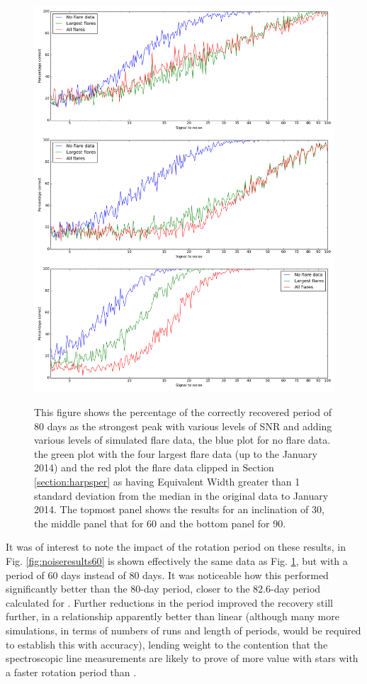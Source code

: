 \begin{figure}[!htbp]
\begin{center}
\includegraphics[scale=0.25]{Figures/Np80.png} \\
\end{center}
\caption{This figure shows the percentage of the correctly recovered period of 80 days as the strongest peak with
  various levels of SNR and adding various levels of simulated flare data, the blue plot for no flare data. the green
  plot with the four largest flare data (up to the January 2014) and the red plot the flare data clipped in Section
  \ref{section:harpsper} as having Equivalent Width greater than 1 standard deviation from the median in the original
  data to January 2014.  The topmost panel shows the results for an inclination of 30{\degree}, the middle panel that
  for 60{\degree} and the bottom panel for 90{\degree}.}
\protect\label{fig:noiseresults}
\end{figure}

It was of interest to note the impact of the rotation period on these results, in Fig. \ref{fig:noiseresults60} is shown
effectively the same data as Fig. \ref{fig:noiseresults}, but with a period of 60 days instead of 80 days. It was
noticeable how this performed significantly better than the 80-day period, closer to the 82.6-day period calculated for
\prox. Further reductions in the period improved the recovery still further, in a relationship apparently better than
linear (although many more simulations, in terms of numbers of runs and length of periods, would be required to
establish this with accuracy), lending weight to the contention that the spectroscopic line measurements are likely to
prove of more value with stars with a faster rotation period than \prox.


